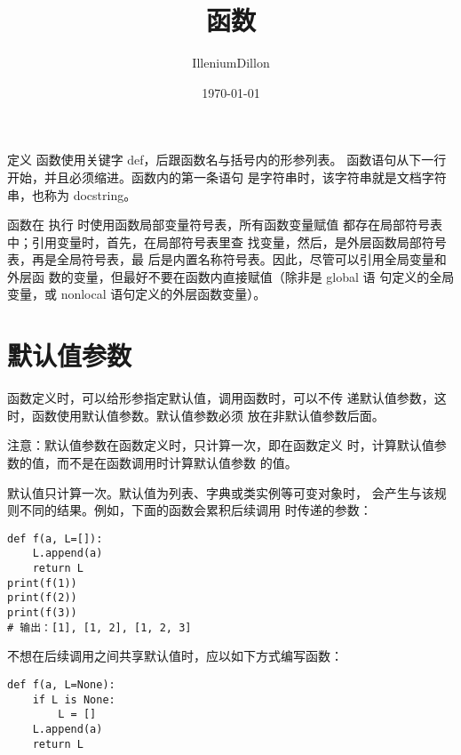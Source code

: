 \documentclass[a4paper, 12pt]{article}
\begin{document}
\title{函数}
\author{IlleniumDillon}
\date{\today}
\maketitle
定义 函数使用关键字 def，后跟函数名与括号内的形参列表。
函数语句从下一行开始，并且必须缩进。函数内的第一条语句
是字符串时，该字符串就是文档字符串，也称为 docstring。\par
函数在 执行 时使用函数局部变量符号表，所有函数变量赋值
都存在局部符号表中；引用变量时，首先，在局部符号表里查
找变量，然后，是外层函数局部符号表，再是全局符号表，最
后是内置名称符号表。因此，尽管可以引用全局变量和外层函
数的变量，但最好不要在函数内直接赋值（除非是 global 语
句定义的全局变量，或 nonlocal 语句定义的外层函数变量）。\par
\section{默认值参数}
函数定义时，可以给形参指定默认值，调用函数时，可以不传
递默认值参数，这时，函数使用默认值参数。默认值参数必须
放在非默认值参数后面。\par
注意：默认值参数在函数定义时，只计算一次，即在函数定义
时，计算默认值参数的值，而不是在函数调用时计算默认值参数
的值。\par
默认值只计算一次。默认值为列表、字典或类实例等可变对象时，
会产生与该规则不同的结果。例如，下面的函数会累积后续调用
时传递的参数：\par
\begin{listing}[h!]
\begin{verbatim}
def f(a, L=[]):
    L.append(a)
    return L
print(f(1))
print(f(2))
print(f(3))
# 输出：[1], [1, 2], [1, 2, 3]
\end{verbatim}
\end{listing}
不想在后续调用之间共享默认值时，应以如下方式编写函数：\par
\begin{listing}[h!]
\begin{verbatim}
def f(a, L=None):
    if L is None:
        L = []
    L.append(a)
    return L
\end{verbatim}
\end{listing}
\end{document}

